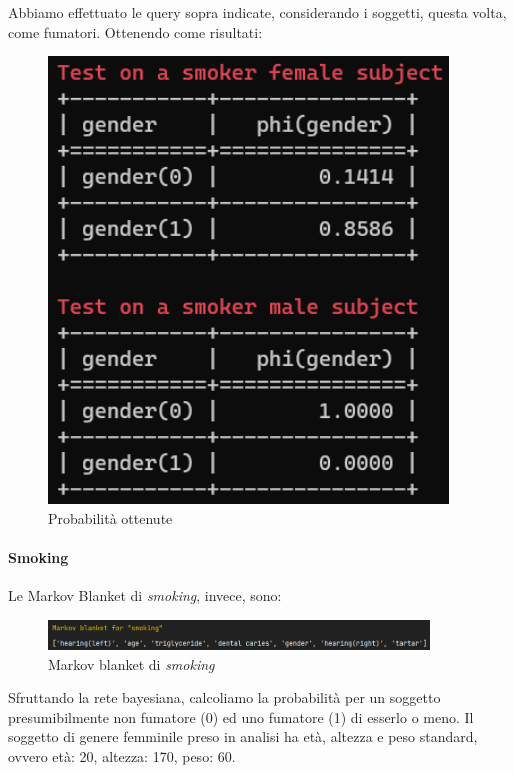 \documentclass{article}
\begin{document}
\noindent
Abbiamo effettuato le query sopra indicate, considerando i soggetti, questa volta, come fumatori.
Ottenendo come risultati:

\begin{figure}[H]
        \includegraphics[width=10.6cm]{smokeGen}
        \centering
        \caption{Probabilità ottenute}
        \centering
\end{figure}


\paragraph{Smoking}

Le Markov Blanket di \textit{smoking}, invece, sono:

\begin{figure}[H]
        \includegraphics[width=0.9\textwidth]{MARK}
        \centering
        \caption{Markov blanket di \textit{smoking}}
        \centering
\end{figure}

\noindent
Sfruttando la rete bayesiana, calcoliamo la probabilità per un soggetto presumibilmente non fumatore (0) ed uno fumatore (1) di esserlo o meno. Il soggetto di genere femminile preso in analisi ha età, altezza e peso standard, ovvero età: 20, altezza: 170, peso: 60.\\
\end{document}
